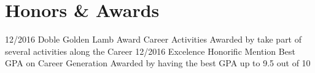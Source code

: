 \documentclass[]{friggeri-cv}
\begin{document}
\section{Honors \& Awards}
\begin{entrylist}
  \entry
    {12/2016}
    {Doble Golden Lamb Award}
    {Career Activities}
    {Awarded by take part of several activities along the Career }
  \entry
    {12/2016}
    {Excelence Honorific Mention }
    {Best GPA on Career Generation}
    {Awarded by having the best GPA up to 9.5 out of 10}
\end{entrylist}
\end{document}
